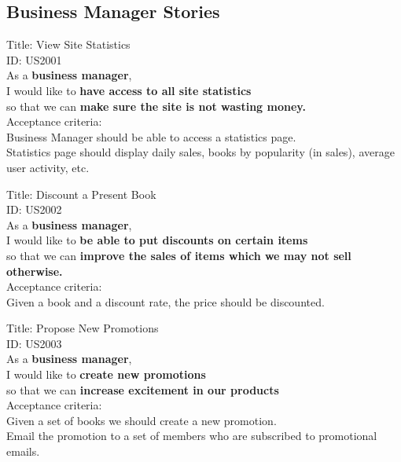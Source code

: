 \documentclass{article}
\begin{document}
\subsection{Business Manager Stories}

\begin{framed}
\noindent
Title: View Site Statistics \\
ID: US2001 \\
As a \textbf{business manager},\\
 \textbullet  \quad \quad I would like to \textbf{have access to all site statistics}\\ 
 \textbullet  \quad \quad so that we can \textbf{make sure the site is not wasting money.}\\
 Acceptance criteria: \\
  \textbullet  \quad \quad Business Manager should be able to access a statistics page.\\
  \textbullet  \quad \quad Statistics page should display daily sales, books by popularity (in sales), average user activity, etc.\\
\end{framed}

\newpage


\begin{framed}
\noindent
Title: Discount a Present Book \\
ID: US2002 \\
As a \textbf{business manager},\\
 \textbullet  \quad \quad I would like to \textbf{be able to put discounts on certain items}\\ 
 \textbullet  \quad \quad so that we can \textbf{improve the sales of items which we may not sell otherwise.}\\
 Acceptance criteria: \\
  \textbullet  \quad \quad Given a book and a discount rate, the price should be discounted.\\
\end{framed}

\begin{framed}
\noindent
Title: Propose New Promotions \\
ID: US2003 \\
As a \textbf{business manager},\\
 \textbullet  \quad \quad I would like to \textbf{create new promotions}\\ 
 \textbullet  \quad \quad so that we can \textbf{increase excitement in our products}\\
 Acceptance criteria: \\
  \textbullet  \quad \quad Given a set of books we should create a new promotion.\\
  \textbullet  \quad \quad Email the promotion to a set of members who are subscribed to promotional emails. \\
\end{framed}
\end{document}
